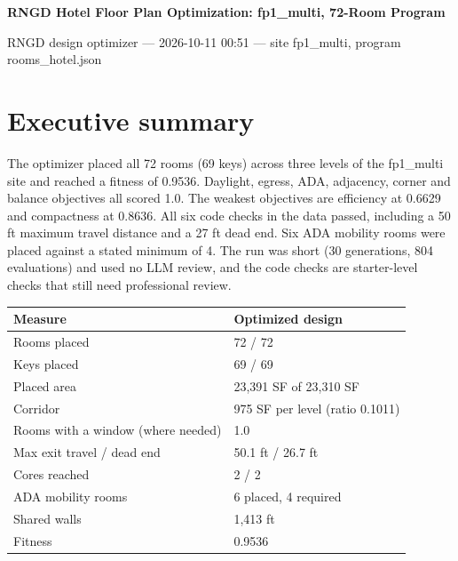 \documentclass[10pt]{article}
\begin{document}
{\color{bp}\Large\bfseries RNGD Hotel Floor Plan Optimization: fp1\_multi, 72-Room Program}\par
{\small RNGD design optimizer --- 2026-10-11 00:51 --- site fp1\_multi, program rooms\_hotel.json}\par
{}

\section{Executive summary}
The optimizer placed all 72 rooms (69 keys) across three levels of the fp1\_multi site and reached a fitness of 0.9536. Daylight, egress, ADA, adjacency, corner and balance objectives all scored 1.0. The weakest objectives are efficiency at 0.6629 and compactness at 0.8636. All six code checks in the data passed, including a 50 ft maximum travel distance and a 27 ft dead end. Six ADA mobility rooms were placed against a stated minimum of 4. The run was short (30 generations, 804 evaluations) and used no LLM review, and the code checks are starter-level checks that still need professional review.

{\small\begin{longtable}{p{6cm}p{9.5cm}}\toprule
\textbf{Measure} & \textbf{Optimized design} \\ \midrule \endhead
Rooms placed & 72 / 72 \\
Keys placed & 69 / 69 \\
Placed area & 23,391 SF of 23,310 SF \\
Corridor & 975 SF per level (ratio 0.1011) \\
Rooms with a window (where needed) & 1.0 \\
Max exit travel / dead end & 50.1 ft / 26.7 ft \\
Cores reached & 2 / 2 \\
ADA mobility rooms & 6 placed, 4 required \\
Shared walls & 1,413 ft \\
Fitness & 0.9536 \\
\bottomrule\end{longtable}}
\end{document}
